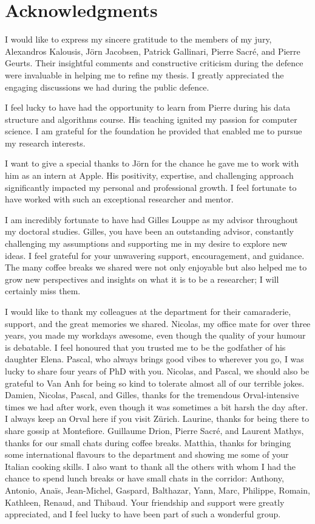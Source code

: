 
\chapter*{Acknowledgments}
I would like to express my sincere gratitude to the members of my jury, Alexandros Kalousis, J{\"o}rn Jacobsen, Patrick Gallinari, Pierre Sacr{\'e}, and Pierre Geurts. Their insightful comments and constructive criticism during the defence were invaluable in helping me to refine my thesis. I greatly appreciated the engaging discussions we had during the public defence.

I feel lucky to have had the opportunity to learn from Pierre during his data structure and algorithms course. His teaching ignited my passion for computer science. I am grateful for the foundation he provided that enabled me to pursue my research interests.

I want to give a special thanks to J{\"o}rn for the chance he gave me to work with him as an intern at Apple. His positivity, expertise, and challenging approach significantly impacted my personal and professional growth. I feel fortunate to have worked with such an exceptional researcher and mentor.

I am incredibly fortunate to have had Gilles Louppe as my advisor throughout my doctoral studies. Gilles, you have been an outstanding advisor, constantly challenging my assumptions and supporting me in my desire to explore new ideas. I feel grateful for your unwavering support, encouragement, and guidance. The many coffee breaks we shared were not only enjoyable but also helped me to grow new perspectives and insights on what it is to be a researcher; I will certainly miss them.

I would like to thank my colleagues at the department for their camaraderie, support, and the great memories we shared. Nicolas, my office mate for over three years, you made my workdays awesome, even though the quality of your humour is debatable. I feel honoured that you trusted me to be the godfather of his daughter Elena. Pascal, who always brings good vibes to wherever you go, I was lucky to share four years of PhD with you. Nicolas, and Pascal, we should also be grateful to Van Anh for being so kind to tolerate almost all of our terrible jokes. Damien, Nicolas, Pascal, and Gilles, thanks for the tremendous Orval-intensive times we had after work, even though it was sometimes a bit harsh the day after. I always keep an Orval here if you visit Zürich. Laurine, thanks for being there to share gossip at Montefiore. Guillaume Drion, Pierre Sacr{\'e}, and Laurent Mathys, thanks for our small chats during coffee breaks. Matthia, thanks for bringing some international flavours to the department and showing me some of your Italian cooking skills. I also want to thank all the others with whom I had the chance to spend lunch breaks or have small chats in the corridor: Anthony, Antonio, Anaïs, Jean-Michel, Gaspard, Balthazar, Yann, Marc, Philippe, Romain, Kathleen, Renaud, and Thibaud. Your friendship and support were greatly appreciated, and I feel lucky to have been part of such a wonderful group.

